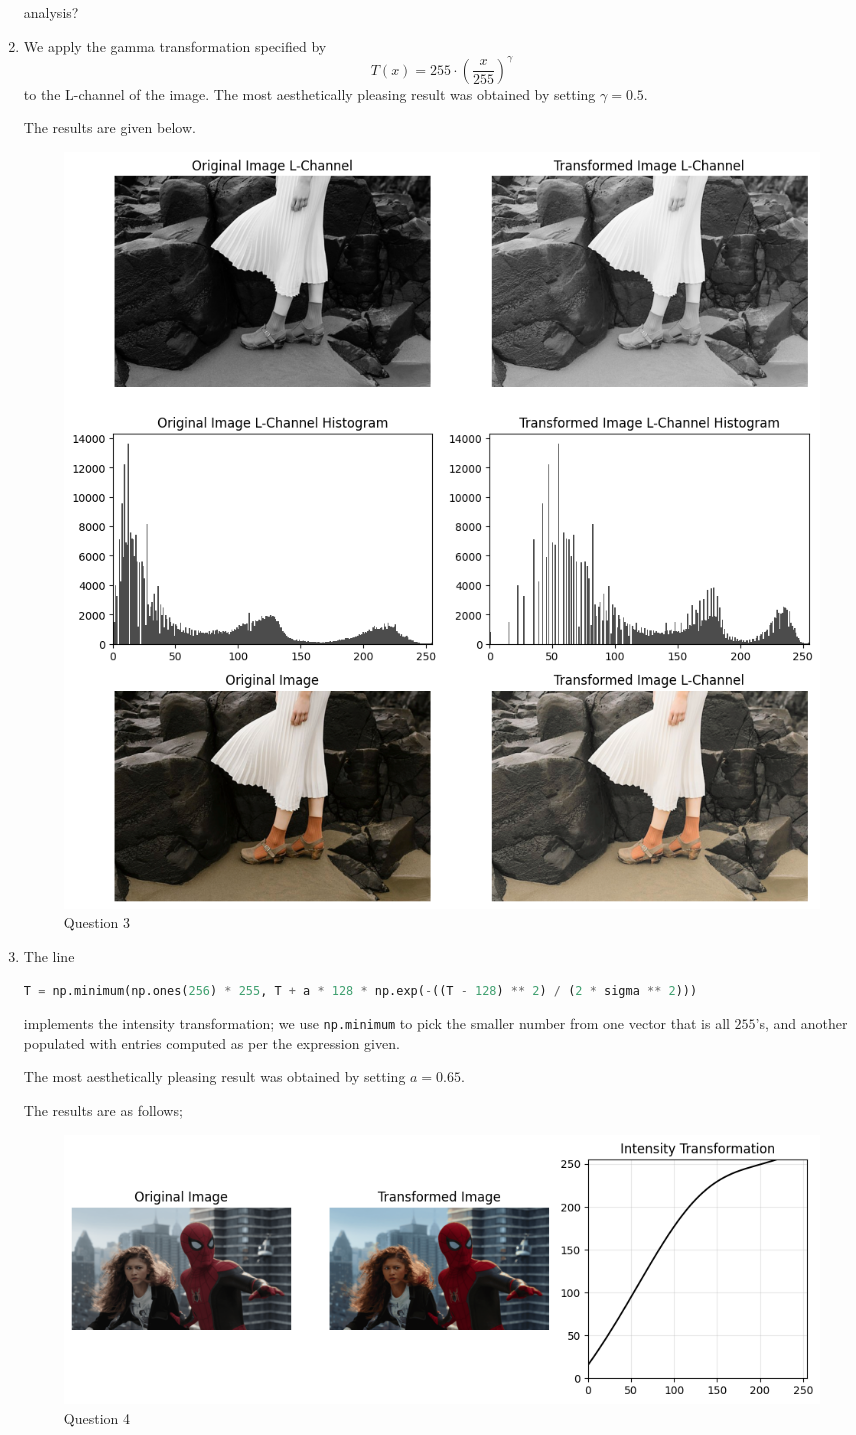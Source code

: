 \documentclass{article}[a4paper]
\begin{document}
\begin{enumerate}
	analysis?

	\item We apply the gamma transformation specified by \[
		T(x) = 255 \cdot \left(\dfrac{x}{255}\right) ^ \gamma
	\] to the L-channel of the image. The most aesthetically pleasing result was obtained by setting $\gamma = 0.5$.
	
	The results are given below.

	\begin{figure}[H]
		\centering
		\includegraphics[width=0.9\linewidth]{images/q3.png}
		\caption{Question 3}
	\end{figure}
	
	\item The line
	\begin{lstlisting}[language=Python]
T = np.minimum(np.ones(256) * 255, T + a * 128 * np.exp(-((T - 128) ** 2) / (2 * sigma ** 2)))
	\end{lstlisting}
	implements the intensity transformation; we use \lstinline|np.minimum| to pick the smaller number from one vector that is all $255$'s, and
	another populated with entries computed as per the expression given.
	
	The most aesthetically pleasing result was obtained by setting $a = 0.65$.
	
	The results are as follows;

	\begin{figure}[H]
		\centering
		\includegraphics[width=0.9\linewidth]{images/q4.png}
		\caption{Question 4}
	\end{figure}


\end{enumerate}
\end{document}
